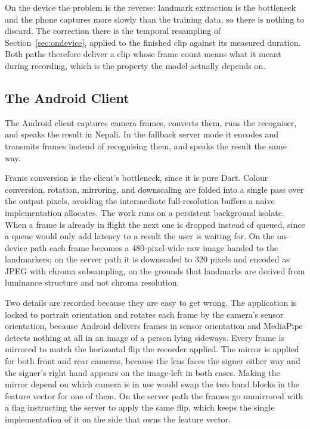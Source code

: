 On the device the problem is the reverse: landmark extraction is the bottleneck and the phone captures more slowly than the training data, so there is nothing to discard. The correction there is the temporal resampling of Section~\ref{sec:ondevice}, applied to the finished clip against its measured duration. Both paths therefore deliver a clip whose frame count means what it meant during recording, which is the property the model actually depends on.

\subsection{The Android Client}

The Android client captures camera frames, converts them, runs the recogniser, and speaks the result in Nepali. In the fallback server mode it encodes and transmits frames instead of recognising them, and speaks the result the same way.

Frame conversion is the client's bottleneck, since it is pure Dart. Colour conversion, rotation, mirroring, and downscaling are folded into a single pass over the output pixels, avoiding the intermediate full-resolution buffers a naive implementation allocates. The work runs on a persistent background isolate. When a frame is already in flight the next one is dropped instead of queued, since a queue would only add latency to a result the user is waiting for. On the on-device path each frame becomes a 480-pixel-wide raw image handed to the landmarkers; on the server path it is downscaled to 320 pixels and encoded as JPEG with chroma subsampling, on the grounds that landmarks are derived from luminance structure and not chroma resolution.

Two details are recorded because they are easy to get wrong. The application is locked to portrait orientation and rotates each frame by the camera's sensor orientation, because Android delivers frames in sensor orientation and MediaPipe detects nothing at all in an image of a person lying sideways. Every frame is mirrored to match the horizontal flip the recorder applied. The mirror is applied for both front and rear cameras, because the lens faces the signer either way and the signer's right hand appears on the image-left in both cases. Making the mirror depend on which camera is in use would swap the two hand blocks in the feature vector for one of them. On the server path the frames go unmirrored with a flag instructing the server to apply the same flip, which keeps the single implementation of it on the side that owns the feature vector.

